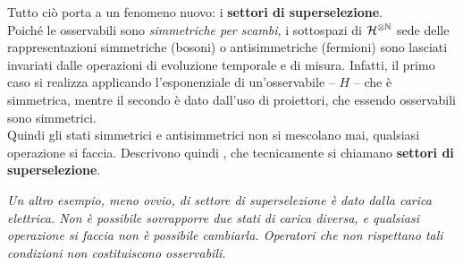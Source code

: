 \documentclass[../../FisicaTeorica.tex]{subfiles}
\begin{document}
Tutto ciò porta a un fenomeno nuovo: i \textbf{settori di superselezione}.\\
Poiché le osservabili sono \textit{simmetriche per scambi}, i sottospazi di $\mathcal{H}^{\otimes \mathbb{N}}$ sede delle rappresentazioni simmetriche (bosoni) o antisimmetriche (fermioni) sono lasciati invariati dalle operazioni di evoluzione temporale e di misura. Infatti, il primo caso si realizza applicando l'esponenziale di un'osservabile -- $H$ -- che è simmetrica, mentre il secondo è dato dall'uso di proiettori, che essendo osservabili sono simmetrici.\\
Quindi gli stati simmetrici e antisimmetrici non si mescolano mai, qualsiasi operazione si faccia. Descrivono quindi , che tecnicamente si chiamano \textbf{settori di superselezione}.

\textit{Un altro esempio, meno ovvio, di settore di superselezione è dato dalla carica elettrica. Non è possibile sovrapporre due stati di carica diversa, e qualsiasi operazione si faccia non è possibile cambiarla. Operatori che non rispettano tali condizioni non costituiscono osservabili.}\\
\end{document}
